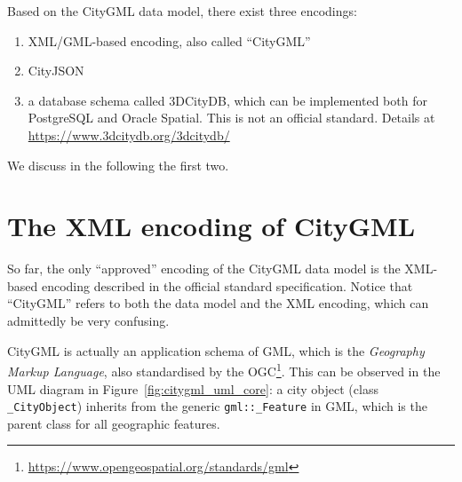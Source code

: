 Based on the CityGML data model, there exist three encodings:
\begin{enumerate}
  \item XML/GML-based encoding, also called ``CityGML''
  \item CityJSON
  \item a database schema called 3DCityDB, which can be implemented both for PostgreSQL and Oracle Spatial. This is not an official standard. Details at \url{https://www.3dcitydb.org/3dcitydb/}
\end{enumerate}
We discuss in the following the first two.


\section{The XML encoding of CityGML}
\label{sec:citygmlxml}

So far, the only ``approved'' encoding of the CityGML data model is the XML-based encoding described in the official standard specification.
Notice that ``CityGML'' refers to both the data model and the XML encoding, which can admittedly be very confusing.

%

CityGML is actually an application schema of GML, which is the \emph{Geography Markup Language}, also standardised by the OGC\footnote{\url{https://www.opengeospatial.org/standards/gml}}.
This can be observed in the UML diagram in Figure~\ref{fig:citygml_uml_core}: a city object (class \texttt{\_CityObject}) inherits from the generic \texttt{gml::\_Feature} in GML, which is the parent class for all geographic features.
  
%


